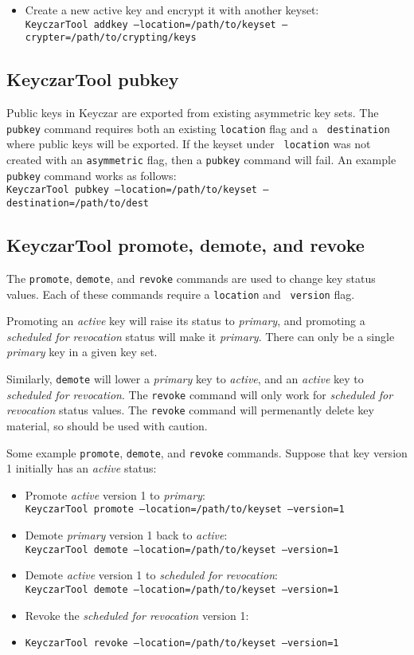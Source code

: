 \documentclass{llncs}
\begin{document}
\begin{itemize}
\item Create a new active key and encrypt it with another keyset: \\
{\tt KeyczarTool addkey --location=/path/to/keyset
--crypter=/path/to/crypting/keys}
\end{itemize}

\subsection{KeyczarTool pubkey}

Public keys in Keyczar are exported from existing asymmetric key sets. The
{\tt pubkey} command requires both an existing {\tt location} flag and a {\tt
destination} where public keys will be exported. If the keyset under {\tt
location} was not created with an {\tt asymmetric} flag, then a {\tt pubkey}
command will fail. An example {\tt pubkey} command works as follows: \\
{\tt KeyczarTool pubkey --location=/path/to/keyset --destination=/path/to/dest}

\subsection{KeyczarTool promote, demote, and revoke}

The {\tt promote}, {\tt demote}, and {\tt revoke} commands are used to change
key status values. Each of these commands require a {\tt location} and {\tt
version} flag. 

Promoting an {\it active} key will raise its status to
{\it primary}, and promoting a {\it scheduled for revocation} status will make
it {\it primary}. There can only be a single {\it primary} key in a given key
set. 

Similarly, {\tt demote} will lower a {\it primary} key to {\it active},
and an {\it active} key to {\it scheduled for revocation}. The {\tt revoke}
command will only work for {\it scheduled for revocation} status values.
The {\tt revoke} command will permenantly delete key material, so should be
used with caution.

Some example {\tt promote}, {\tt demote}, and {\tt revoke} commands. Suppose
that key version 1 initially has an {\it active} status:
\begin{itemize}
\item Promote {\it active} version 1 to {\it primary}: \\
{\tt KeyczarTool promote --location=/path/to/keyset --version=1}
\item Demote {\it primary} version 1 back to {\it active}: \\
{\tt KeyczarTool demote --location=/path/to/keyset --version=1}
\item Demote {\it active} version 1 to {\it scheduled for revocation}: \\
{\tt KeyczarTool demote --location=/path/to/keyset --version=1}
\item Revoke the {\it scheduled for revocation} version 1:  
\item {\tt KeyczarTool revoke --location=/path/to/keyset --version=1}
\end{itemize}
\end{document}
